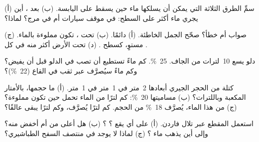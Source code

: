 \begin{exercise}[$\star$]\label{exo:g6:water-underground:3}
(أ) سمِّ الطرق الثلاثة التي يمكن أن يسلكها ماء  حين يسقط على
اليابسة. (ب) بعد ، أين يجري ماء أكثر على السطح: في موقف سيارات أم في
مرج؟ لماذا؟
\end{exercise}

\begin{exercise}[$\star$]\label{exo:g6:water-underground:4}
صواب أم خطأ؟ صحّح الجمل الخاطئة. (أ)   
دائمًا. (ب) تحت ، تكون  مملوءة بالماء.
(ج)  مستوٍ، كسطح . (د)  تحت الأرض
أكثر منه في كل .
\end{exercise}

\begin{exercise}[$\star\star$]\label{exo:g6:water-underground:5}
دلو يسع 10~لترات من  الجاف.   25~\%.
كم ماءً تستطيع أن تصب في الدلو قبل أن يفيض؟ وكم
ماءً سيُصرَّف عبر ثقب في القاع (22~\%)؟
\end{exercise}

\begin{exercise}[$\star\star$]\label{exo:g6:water-underground:6}
كتلة من الحجر الجيري أبعادها 2~متر في 1~متر في 1~متر. (أ) ما حجمها، بالأمتار
المكعبة وباللترات؟ (ب) مساميتها 20~\%: كم لترًا من
الماء تحمل حين تكون مملوءة؟ (ج) من هذا الماء، يُصرَّف 18~\% من
الحجم. كم لترًا يُصرَّف، وكم لترًا يبقى عالقًا؟
\end{exercise}

\begin{exercise}[$\star\star$]\label{exo:g6:water-underground:7}
استعمل المقطع عبر تلال فاردن. (أ) على أي  يقع ؟
؟ (ب) هل  أعلى من  أم أخفض منه؟ وإلى أين يذهب ماء
؟ (ج) لماذا لا يوجد  في منتصف السفح
الطباشيري؟
\end{exercise}

